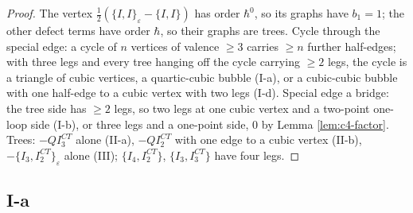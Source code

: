 \begin{proof}
The vertex $\tfrac12(\{I,I\}_\varepsilon-\{I,I\})$ has order $\hbar^0$, so its graphs have $b_1=1$; the other defect terms have order $\hbar$, so their graphs are trees. Cycle through the special edge: a cycle of $n$ vertices of valence $\ge3$ carries $\ge n$ further half-edges; with three legs and every tree hanging off the cycle carrying $\ge2$ legs, the cycle is a triangle of cubic vertices, a quartic-cubic bubble (I-a), or a cubic-cubic bubble with one half-edge to a cubic vertex with two legs (I-d). Special edge a bridge: the tree side has $\ge2$ legs, so two legs at one cubic vertex and a two-point one-loop side (I-b), or three legs and a one-point side, $0$ by Lemma \ref{lem:c4-factor}. Trees: $-QI^{CT}_3$ alone (II-a), $-QI^{CT}_2$ with one edge to a cubic vertex (II-b), $-\{I_3,I^{CT}_2\}_\varepsilon$ alone (III); $\{I_4,I^{CT}_2\}$, $\{I_3,I^{CT}_3\}$ have four legs.
\end{proof}

\subsection{I-a}

